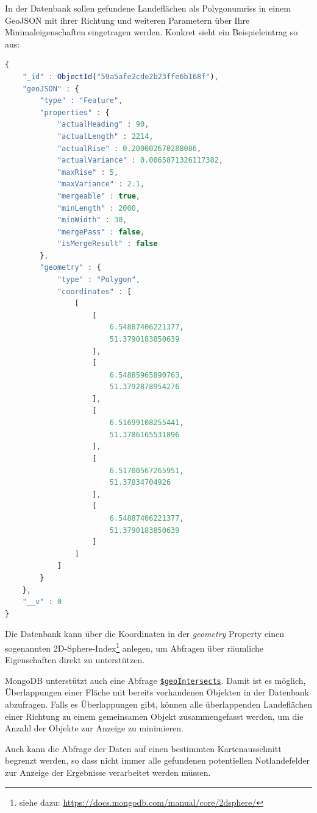 \documentclass[10pt,a4paper]{report}
\begin{document}
In der Datenbank sollen gefundene Landeflächen als Polygonumriss in einem GeoJSON mit ihrer Richtung und weiteren Parametern über Ihre Minimaleigenschaften eingetragen werden. Konkret sieht ein Beispieleintrag so aus:
\begin{lstlisting}[language=JavaScript]
{
    "_id" : ObjectId("59a5afe2cde2b23ffe6b168f"),
    "geoJSON" : {
        "type" : "Feature",
        "properties" : {
            "actualHeading" : 90,
            "actualLength" : 2214,
            "actualRise" : 0.200002670288086,
            "actualVariance" : 0.0065871326117382,
            "maxRise" : 5,
            "maxVariance" : 2.1,
            "mergeable" : true,
            "minLength" : 2000,
            "minWidth" : 30,
            "mergePass" : false,
            "isMergeResult" : false
        },
        "geometry" : {
            "type" : "Polygon",
            "coordinates" : [ 
                [ 
                    [ 
                        6.54887406221377, 
                        51.3790183850639
                    ], 
                    [ 
                        6.54885965890763, 
                        51.3792878954276
                    ], 
                    [ 
                        6.51699108255441, 
                        51.3786165531896
                    ], 
                    [ 
                        6.51700567265951, 
                        51.37834704926
                    ], 
                    [ 
                        6.54887406221377, 
                        51.3790183850639
                    ]
                ]
            ]
        }
    },
    "__v" : 0
}
\end{lstlisting}

Die Datenbank kann über die Koordinaten in der \emph{geometry} Property einen sogenannten 2D-Sphere-Index\footnote{siehe dazu: \href{https://docs.mongodb.com/manual/core/2dsphere/}{https://docs.mongodb.com/manual/core/2dsphere/}} anlegen, um Abfragen über räumliche Eigenschaften direkt zu unterstützen.

MongoDB unterstützt auch eine Abfrage \href{https://docs.mongodb.com/manual/reference/operator/query/geoIntersects/#op._S_geoIntersects}{\texttt{\$geoIntersects}}. Damit ist es möglich, Überlappungen einer Fläche mit bereits vorhandenen Objekten in der Datenbank abzufragen. 
Falls es Überlappungen gibt, können alle überlappenden Landeflächen einer Richtung zu einem gemeinsamen Objekt zusammengefasst werden, um die Anzahl der Objekte zur Anzeige zu minimieren.

Auch kann die Abfrage der Daten auf einen bestimmten Kartenausschnitt begrenzt werden, so dass nicht immer alle gefundenen potentiellen Notlandefelder zur Anzeige der Ergebnisse verarbeitet werden müssen.
\end{document}
